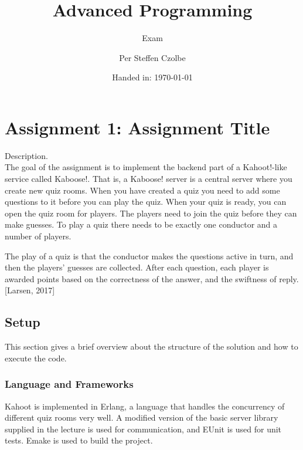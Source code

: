 \documentclass[11pt, a4paper]{article}
\author{Per Steffen Czolbe}
\title{Advanced Programming}
\subtitle{Exam} %
\date{Handed in: \today}
\begin{document}
\maketitle

\tableofcontents

\section{Assignment 1: Assignment Title}
Description. \\
The goal of the assignment is to implement the backend part of a Kahoot!-like service called Kaboose!. That is, a Kaboose! server is a central server where you create new quiz rooms. When you have created a quiz you need to add some questions to it before you can play the quiz. When your quiz is ready, you can open the quiz room for players. The players need to join the quiz before they can make guesses. To play a quiz there needs to be exactly one conductor and a number of players.

The play of a quiz is that the conductor makes the questions active in turn, and then the players’ guesses are collected. After each question, each player is awarded points based on the correctness of the answer, and the swiftness of reply. [Larsen, 2017]

\subsection{Setup}
This section gives a brief overview about the structure of the solution and how to execute the code.

\subsubsection{Language and Frameworks}
Kahoot is implemented in Erlang, a language that handles the concurrency of different quiz rooms very well. A modified version of the basic server library supplied in the lecture is used for communication, and EUnit is used for unit tests. Emake is used to build the project.
\end{document}
